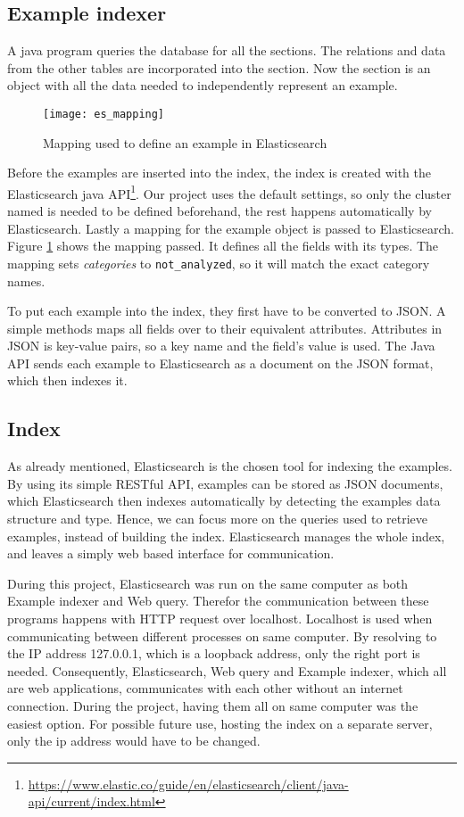 \subsection{Example indexer}
A java program queries the database for all the sections. The relations and data from the other tables are incorporated into the section. Now the section is an object with all the data needed to independently represent an example.

\begin{figure}[H] 
\caption{Mapping used to define an example in Elasticsearch}
\centering
\texttt{[image: es\_mapping]}
\label{fig:es_mapping}
\end{figure}

Before the examples are inserted into the index, the index is created with the Elasticsearch java API\footnote{\url{https://www.elastic.co/guide/en/elasticsearch/client/java-api/current/index.html}}. Our project uses the default settings, so only the cluster named is needed to be defined beforehand, the rest happens automatically by Elasticsearch. Lastly a mapping for the example object is passed to Elasticsearch. Figure \ref{fig:es_mapping} shows the mapping passed. It defines all the fields with its types. The mapping sets \textit{categories} to \texttt{not\_analyzed}, so it will match the exact category names.


To put each example into the index, they first have to be converted to JSON. A simple methods maps all fields over to their equivalent attributes. Attributes in JSON is key-value pairs, so a key name and the field's value is used. The Java API sends each example to Elasticsearch as a document on the JSON format, which then indexes it.

\subsection{Index}
As already mentioned, Elasticsearch is the chosen tool for indexing the examples. By using its simple RESTful API, examples can be stored as JSON documents, which Elasticsearch then indexes automatically by detecting the examples data structure and type. Hence, we can focus more on the queries used to retrieve examples, instead of building the index. Elasticsearch manages the whole index, and leaves a simply web based interface for communication.

During this project, Elasticsearch was run on the same computer as both Example indexer and Web query. Therefor the communication between these programs happens with HTTP request over localhost. Localhost is used when communicating between different processes on same computer. By resolving to the IP address 127.0.0.1, which is a loopback address, only the right port is needed. Consequently, Elasticsearch, Web query and Example indexer, which all are web applications, communicates with each other without an internet connection. During the project, having them all on same computer was the easiest option. For possible future use, hosting the index on a separate server, only the ip address would have to be changed.

